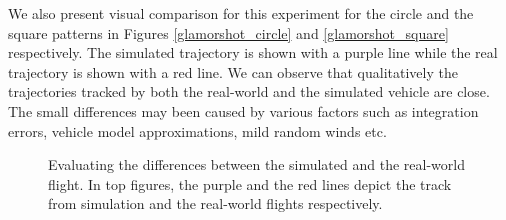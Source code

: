 \documentclass[graybox]{svmult}
\begin{document}
We also present visual comparison for this experiment for the circle and the square patterns in Figures \ref{glamorshot_circle} and \ref{glamorshot_square} respectively. The simulated trajectory is shown with a purple line while the real trajectory is shown with a red line. We can observe that qualitatively the trajectories tracked by both the real-world and the simulated vehicle are close. The small differences may been caused by various factors such as integration errors, vehicle model approximations, mild random winds etc.

\begin{figure}[t]
\centering
{}
\caption{Evaluating the differences between the simulated and the real-world flight. In top figures, the purple and the red lines depict the track from simulation and the real-world flights respectively.}
\label{fig:traj_val}
\end{figure}
\end{document}
